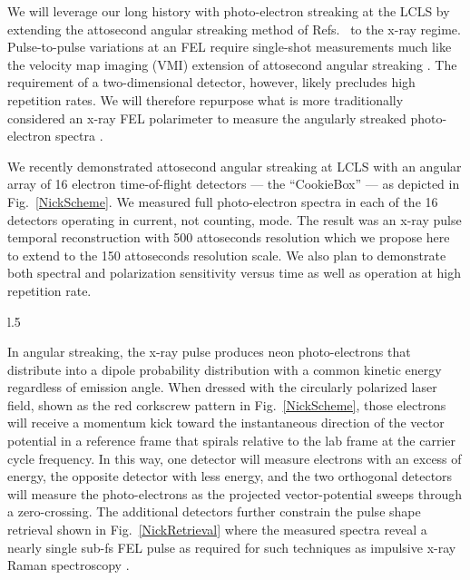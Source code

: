We will leverage our long history with photo-electron streaking at the LCLS \cite{Duesterer11,Meyer12,Helml2014} by extending the attosecond angular streaking method of Refs.~\cite{CorkumAngularStreaking,KellerAngularStreaking} to the x-ray regime.
Pulse-to-pulse variations at an FEL require single-shot measurements much like the velocity map imaging (VMI) \cite{VrakkingRSI} extension of attosecond angular streaking \cite{attoclockVMI2013}.
The requirement of a two-dimensional detector, however, likely precludes high repetition rates. 
We will therefore repurpose what is more traditionally considered an x-ray FEL polarimeter \cite{Markus2014,Allaria2014,Mazza2014,Lutman2016} to measure the angularly streaked photo-electron spectra \cite{Markus2014,Allaria2014,Mazza2014,Lutman2016}.

We recently demonstrated attosecond angular streaking at LCLS with an angular array of 16 electron time-of-flight detectors --- the ``CookieBox'' --- as depicted in Fig.~\ref{NickScheme}.
We measured full photo-electron spectra in each of the 16 detectors operating in current, not counting, mode.
The result was an x-ray pulse temporal reconstruction with 500 attoseconds resolution \cite{Nick2016} which we propose here to extend to the 150 attoseconds resolution scale.
We also plan to demonstrate both spectral and polarization sensitivity versus time as well as operation at high repetition rate.

\begin{wrapfigure}[20]{l}{.5\linewidth}
\vspace{-\baselineskip}
\vspace{-1\baselineskip}
\caption{\label{NickRetrieval}X-ray pulse shape retrieval from our recent angular streaking measurement at LCLS \cite{Nick2016}.}
\end{wrapfigure}

In angular streaking, the x-ray pulse produces neon photo-electrons that distribute into a dipole probability distribution with a common kinetic energy regardless of emission angle.
When dressed with the circularly polarized laser field, shown as the red corkscrew pattern in Fig.~\ref{NickScheme}, those electrons will receive a momentum kick toward the instantaneous direction of the vector potential in a reference frame that spirals relative to the lab frame at the carrier cycle frequency.
In this way, one detector will measure electrons with an excess of energy, the opposite detector with less energy, and the two orthogonal detectors will measure the photo-electrons as the projected vector-potential sweeps through a zero-crossing.
The additional detectors further constrain the pulse shape retrieval shown in Fig.~\ref{NickRetrieval} where the measured spectra reveal a nearly single sub-fs FEL pulse as required for such techniques as impulsive x-ray Raman spectroscopy \cite{TIGER2015}.

